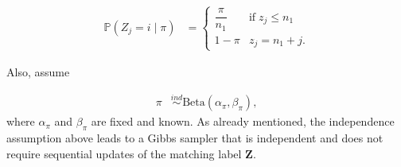 \documentclass[ba]{imsart}
\newcommand{\bZ}{\boldsymbol{Z}}
\newcommand{\bgamma}{\boldsymbol{\gamma}}
\begin{document}
\begin{align}
\mathbb{P}(Z_j = i \mid \pi) 
&=
\begin{cases}
 \dfrac{\pi}{n_1}  &  \text{if}  \; z_j \leq n_1\\
  1- \pi & z_j = n_1 + j.
\end{cases}
\end{align}

Also, assume 

\begin{align}
  \pi &\stackrel{ind}{\sim} \text{Beta}(\alpha_{\pi}, \beta_{\pi}),
\end{align}
where $\alpha_{\pi}$ and $\beta_{\pi}$ are fixed and known. As already mentioned, the independence assumption above leads to a Gibbs sampler that is independent and does not require sequential updates of the matching label $\bZ.$

%
\end{document}
